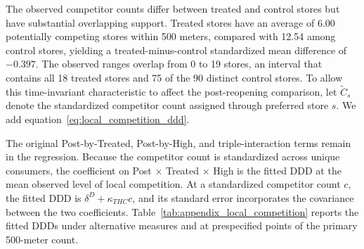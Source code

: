 \documentclass[11 pt]{article}
\begin{document}
The observed competitor counts differ between treated and control stores but have substantial overlapping support. Treated stores have an average of 6.00 potentially competing stores within 500 meters, compared with 12.54 among control stores, yielding a treated-minus-control standardized mean difference of $-0.397$. The observed ranges overlap from 0 to 19 stores, an interval that contains all 18 treated stores and 75 of the 90 distinct control stores. To allow this time-invariant characteristic to affect the post-reopening comparison, let $\widetilde C_s$ denote the standardized competitor count assigned through preferred store $s$. We add equation~\eqref{eq:local_competition_ddd}.

The original Post-by-Treated, Post-by-High, and triple-interaction terms remain in the regression. Because the competitor count is standardized across unique consumers, the coefficient on Post $\times$ Treated $\times$ High is the fitted DDD at the mean observed level of local competition. At a standardized competitor count $c$, the fitted DDD is $\delta^D+\kappa_{THC}c$, and its standard error incorporates the covariance between the two coefficients. Table~\ref{tab:appendix_local_competition} reports the fitted DDDs under alternative measures and at prespecified points of the primary 500-meter count.
\end{document}
